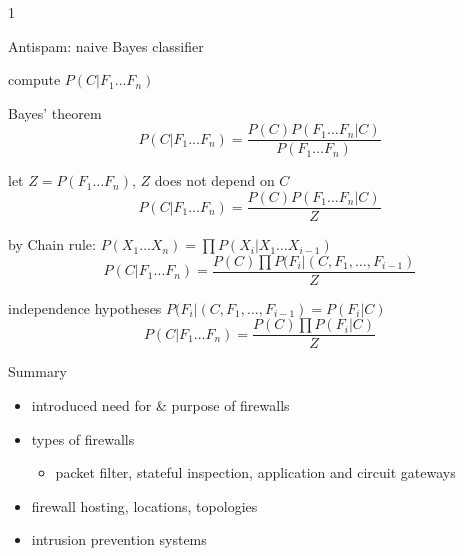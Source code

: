 1\documentclass{beamer}
\begin{document}
\begin{frame}{Antispam: naive Bayes classifier}
  \begin{itemize}
     {
  \item compute $P(C|F_1 \dots F_n)$
  \item Bayes' theorem
    \[
    P(C|F_1 \dots F_n) =
    \frac
    {P(C) P(F_1 \dots F_n | C) }
    {P(F_1 \dots F_n)}
    \]
  \item let $Z = P(F_1 \dots F_n)$, $Z$ does not depend on $C$
    \[
    P(C|F_1 \dots F_n) =
    \frac
    {P(C) P(F_1 \dots F_n | C) }
    {Z}
    \]
  }
  \item by Chain rule: $P(X_1 \dots X_n) = \prod{P(X_i | X_1 \dots X_{i-1})}$
    \[
    P(C|F_1 \dots F_n) =
    \frac
    {P(C) 
     \prod{P(F_i| (C,  F_1, \dots, F_{i-1})}
    }
    {Z}
    \]
  \item<2-> independence hypotheses $P(F_i| (C,  F_1, \dots, F_{i-1})
    = P(F_i| C)$
    \[
    P(C|F_1 \dots F_n) =
    \frac
    {P(C) 
     \prod{P(F_i| C)}
    }
    {Z}
    \]
  \end{itemize}
\end{frame}

\begin{frame}{Summary}
  \begin{itemize}
  \item introduced need for \& purpose of firewalls 
  \item types of firewalls 
    \begin{itemize}
    \item packet filter, stateful inspection, application and 
      circuit gateways 
    \end{itemize}
  \item firewall hosting, locations, topologies 
  \item intrusion prevention systems
  \end{itemize}
\end{frame}
\end{document}
